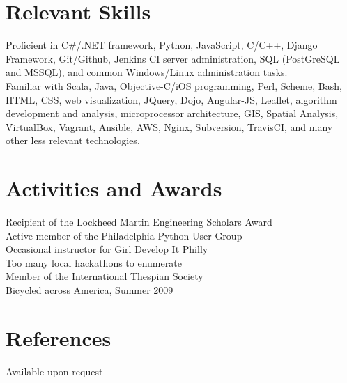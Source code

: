 \documentclass{res}
\begin{document}
\begin{resume}
\section{Relevant Skills}
Proficient in C\#/.NET framework, Python, JavaScript, C/C++, Django Framework,
Git/Github, Jenkins CI server administration, SQL (PostGreSQL and MSSQL), 
and common Windows/Linux administration tasks.\\
Familiar with Scala, Java, Objective-C/iOS programming, Perl, Scheme, Bash, HTML, CSS,
web visualization, JQuery, Dojo, Angular-JS, Leaflet, algorithm development
and analysis, microprocessor architecture, GIS, Spatial Analysis,
VirtualBox, Vagrant, Ansible, AWS, Nginx, Subversion, TravisCI,
and many other less relevant technologies.
 
\section{Activities and Awards}          
    Recipient of the Lockheed Martin Engineering Scholars Award\\
    Active member of the Philadelphia Python User Group\\
    Occasional instructor for Girl Develop It Philly\\
    Too many local hackathons to enumerate\\
    Member of the International Thespian Society\\
    Bicycled across America, Summer 2009

\section{References}
    Available upon request
 
\end{resume}
\end{document}
